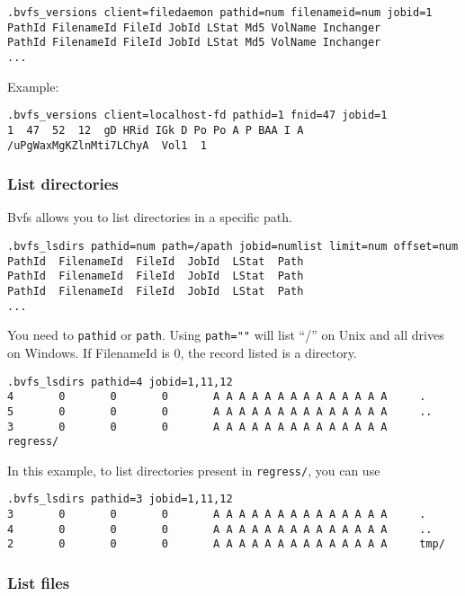 \begin{verbatim}
.bvfs_versions client=filedaemon pathid=num filenameid=num jobid=1
PathId FilenameId FileId JobId LStat Md5 VolName Inchanger
PathId FilenameId FileId JobId LStat Md5 VolName Inchanger
...
\end{verbatim}

Example:

\begin{verbatim}
.bvfs_versions client=localhost-fd pathid=1 fnid=47 jobid=1
1  47  52  12  gD HRid IGk D Po Po A P BAA I A   /uPgWaxMgKZlnMti7LChyA  Vol1  1
\end{verbatim}

\subsubsection*{List directories}

Bvfs allows you to list directories in a specific path.
\begin{verbatim}
.bvfs_lsdirs pathid=num path=/apath jobid=numlist limit=num offset=num
PathId  FilenameId  FileId  JobId  LStat  Path
PathId  FilenameId  FileId  JobId  LStat  Path
PathId  FilenameId  FileId  JobId  LStat  Path
...
\end{verbatim}

You need to \texttt{pathid} or \texttt{path}. Using \texttt{path=""} will list
``/'' on Unix and all drives on Windows.  If FilenameId is 0, the record
listed is a directory.

\begin{verbatim}
.bvfs_lsdirs pathid=4 jobid=1,11,12
4       0       0       0       A A A A A A A A A A A A A A     .
5       0       0       0       A A A A A A A A A A A A A A     ..
3       0       0       0       A A A A A A A A A A A A A A     regress/
\end{verbatim}

In this example, to list directories present in \texttt{regress/}, you can use
\begin{verbatim}
.bvfs_lsdirs pathid=3 jobid=1,11,12
3       0       0       0       A A A A A A A A A A A A A A     .
4       0       0       0       A A A A A A A A A A A A A A     ..
2       0       0       0       A A A A A A A A A A A A A A     tmp/
\end{verbatim}

\subsubsection*{List files}

